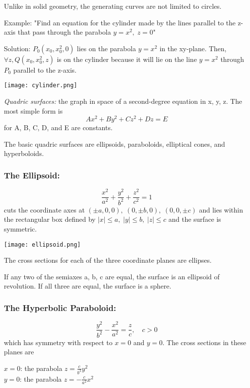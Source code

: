 \documentclass[12pt]{article}
\begin{document}
Unlike in solid geometry, the generating curves are not limited to circles.

Example:
"Find an equation for the cylinder made by the lines parallel to the z-axis that pass through the parabola $y = x^2, \; z=0$"

Solution:
$P_0 (x_0, x_0^2, 0)$ lies on the parabola $y=x^2$ in the xy-plane. Then, $\forall z, Q(x_0, x_0^2, z)$ is on the cylinder because it will lie on the line $y=x^2$ through $P_0$ parallel to the z-axis. 

\begin{center}
    \texttt{[image: cylinder.png]} 
\end{center}

\emph{Quadric surfaces:} the graph in space of a second-degree equation in x, y, z. The most simple form is 
\[Ax^2 + By^2 + Cz^2 + Dz = E\]
for A, B, C, D, and E are constants.

The basic quadric surfaces are ellipsoids, paraboloids, elliptical cones, and hyperboloids. 

\subsubsection{The Ellipsoid:}
\[\frac{x^2}{a^2} + \frac{y^2}{b^2} + \frac{z^2}{c^2} = 1\]
cuts the coordinate axes at $(\pm a, 0, 0),\;(0, \pm b, 0),\;(0, 0, \pm c)$ and lies within the rectangular box defined by $|x| \leq a, \; |y| \leq b, \; |z| \leq c$ and the surface is symmetric.

\texttt{[image: ellipsoid.png]}

The cross sections for each of the three coordinate planes are ellipses.

If any two of the semiaxes a, b, c are equal, the surface is an ellipsoid of revolution. If all three are  equal, the surface is a sphere.

\subsubsection{The Hyperbolic Paraboloid:}
\[\frac{y^2}{b^2} - \frac{x^2}{a^2} = \frac{z}{c}, \quad c> 0\]
which has symmetry with respect to $x= 0$ and $y=0$. The cross sections in these planes are 
\begin{center}
    $x =0$: \quad the parabola $z = \frac{c}{b^2} y^2$\\
    $y=0$: \quad the parabola $z = - \frac{c}{a^2} x^2$
\end{center}
\end{document}
